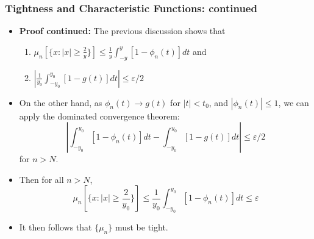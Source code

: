 \documentclass[handout]{beamer}
\begin{document}
 \frame
{
\frametitle{Tightness and Characteristic Functions: continued}

\begin{itemize}
 
\item<1-> \textbf{Proof continued:} The previous discussion shows that 
 \begin{enumerate}
 \item $\mu_n[\{x: |x| \geq \frac{2}{y}\}] \leq \frac{1}{y} \int_{-y}^{y} [1-\phi_n(t)] dt$ and
 \item $\left| \frac{1}{y_0} \int_{-y_0}^{y_0} [1-g(t)] dt \right| \le \varepsilon/2$
\end{enumerate} 
 
\item<3->[-] On the other hand, as $\phi_n(t)\rightarrow g(t)$ for  $|t|<t_0$, and $|\phi_n(t)| \le 1$, we can apply the dominated convergence theorem:
 $$ \left|\int_{-y_0}^{y_0} [1-\phi_n(t)] dt  -\int_{-y_0}^{y_0} [1-g(t)] dt \right| \leq \varepsilon/2 $$
  for $n>N$. 
\item<4->[-] Then for all $n>N$, 
$$\mu_n[\{x: |x| \geq \frac{2}{y_0}\}] \leq \frac{1}{y_0} \int_{-y_0}^{y_0} [1-\phi_n(t)] dt \leq \varepsilon$$
\item<5->[-] It then follows that $\{\mu_n\}$ must be tight. 

\end{itemize}
 }
 
 
 
\end{document}
